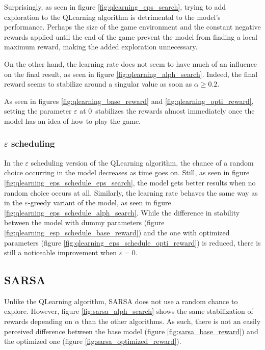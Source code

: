 \documentclass[11pt]{article}
\def\greedyeps{0}
\def\scheduleeps{0}
\begin{document}
Surprisingly, as seen in figure \ref{fig:qlearning_eps_search}, trying to add exploration to the QLearning algorithm is detrimental to the model's performance.
Perhaps the size of the game environment and the constant negative rewards applied until the end of the game prevent the model from finding a local maximum reward, making the added exploration unnecessary.

On the other hand, the learning rate does not seem to have much of an influence on the final result, as seen in figure \ref{fig:qlearning_alph_search}.
Indeed, the final reward seems to stabilize around a singular value as soon as $\alpha \geq 0.2$.

As seen in figures \ref{fig:qlearning_base_reward} and \ref{fig:qlearning_opti_reward}, setting the parameter $\varepsilon$ at \greedyeps\ stabilizes the rewards almost immediately once the model has an idea of how to play the game.

\subsubsection*{$\varepsilon$ scheduling}

In the $\varepsilon$ scheduling version of the QLearning algorithm, the chance of a random choice occurring in the model decreases as time goes on.
Still, as seen in figure \ref{fig:qlearning_eps_schedule_eps_search}, the model gets better results when no random choice occurs at all.
Similarly, the learning rate behaves the same way as in the $\varepsilon$-greedy variant of the model, as seen in figure \ref{fig:qlearning_eps_schedule_alph_search}.
While the difference in stability between the model with dummy parameters (figure \ref{fig:qlearning_esp_schedule_base_reward}) and the one with optimized parameters (figure \ref{fig:qlearning_eps_schedule_opti_reward}) is reduced, there is still a noticeable improvement when $\varepsilon = \scheduleeps$.

\subsection*{SARSA}

Unlike the QLearning algorithm, SARSA does not use a random chance to explore.
However, figure \ref{fig:sarsa_alph_search} shows the same stabilization of rewards depending on $\alpha$ than the other algorithms.
As such, there is not an easily perceived difference between the base model (figure \ref{fig:sarsa_base_reward}) and the optimized one (figure \ref{fig:sarsa_optimized_reward}).
\end{document}
